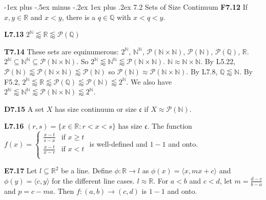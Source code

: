 \documentclass[10pt, landscape]{article}
\makeatletter
\renewcommand{\subsection}{\@startsection{subsection}{3}{0mm}%
                                {-1ex plus -.5ex minus -.2ex}%
                                {1ex plus .2ex}%
                                {\normalfont\small\bfseries}}%
\makeatother
\begin{document}
\begin{multicols*}{3}
\subsection{7.2 Sets of Size Continuum}
\textbf{F7.12} If $x, y \in \mathbb{R}$ and $x < y$, there is a $q \in \mathbb{Q}$ with $x < q < y$.

\textbf{L7.13} $2^\mathbb{N} \lessapprox \mathbb{R} \lessapprox \mathcal{P}(\mathbb{Q})$

\textbf{T7.14} These sets are equinumerous: $2^\mathbb{N}$, $\mathbb{N}^\mathbb{N}$, $\mathcal{P}(\mathbb{N} \times \mathbb{N})$, $\mathcal{P}(\mathbb{N})$, $\mathcal{P}(\mathbb{Q})$, $\mathbb{R}$. $2^\mathbb{N} \subseteq \mathbb{N}^\mathbb{N} \subseteq \mathcal{P}(\mathbb{N} \times \mathbb{N})$. So $2^\mathbb{N} \lessapprox \mathbb{N}^\mathbb{N} \lessapprox \mathcal{P}(\mathbb{N} \times \mathbb{N})$. $\mathbb{N} \approx \mathbb{N} \times \mathbb{N}$. By L5.22, $\mathcal{P}(\mathbb{N})\lessapprox \mathcal{P}(\mathbb{N} \times \mathbb{N}) \lessapprox \mathcal{P}(\mathbb{N})$ so $\mathcal{P}(\mathbb{N}) \approx \mathcal{P}(\mathbb{N} \times \mathbb{N})$. By L7.8, $\mathbb{Q} \lessapprox \mathbb{N}$. By F5.2, $2^\mathbb{N} \lessapprox \mathbb{R} \lessapprox \mathcal{P}(\mathbb{Q}) \lessapprox \mathcal{P}(\mathbb{N}) \lessapprox 2^\mathbb{N}$. We also have $2^\mathbb{N} \lessapprox \mathbb{N}^\mathbb{N} \lessapprox \mathcal{P}(\mathbb{N} \times \mathbb{N}) \lessapprox 2^\mathbb{N}$.

\textbf{D7.15} A set $X$ has size continuum or size $\mathfrak{c}$ if $X \approx \mathcal{P}(\mathbb{N})$.

\textbf{L7.16} $(r, s)=\{x \in \mathbb{R} : r < x < s\}$ has size $\mathfrak{c}$. The function $f(x) =
    \left\{
    \begin{array}{lr}
      \frac{x-t}{s-x} & \text{if $x \geq t$} \\
      \frac{x-t}{x-r} & \text{if $x < t$} \\
    \end{array}
    \right.
    $ is well-defined and $1-1$ and onto.

\textbf{E7.17} Let $l \subseteq \mathbb{R}^2$ be a line. Define $\phi:\mathbb{R}\rightarrow l$ as $\phi(x)=\langle x, mx+c\rangle$ and $\phi(y)=\langle c,y \rangle$ for the different line cases. $l \approx \mathbb{R}$. For $a < b$ and $c < d$, let $m=\frac{d-c}{b-a}$ and $p=c-ma$. Then $f:(a, b) \rightarrow (c, d)$ is $1-1$ and onto.


\end{multicols*}
\end{document}
